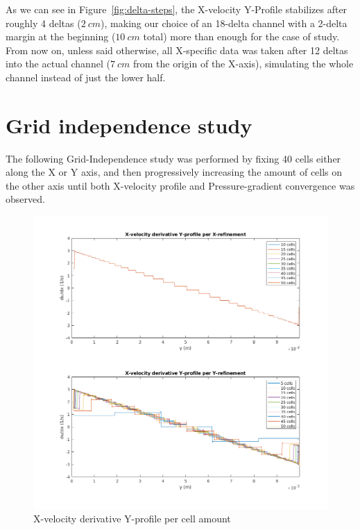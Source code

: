 \documentclass[12pt]{article}
\begin{document}
        As we can see in Figure~\ref{fig:delta-steps}, the X-velocity Y-Profile stabilizes after roughly 4 deltas ($ 2 \: cm $), making our choice of an 18-delta channel with a 2-delta margin at the beginning ($ 10 \: cm $ total) more than enough for the case of study. From now on, unless said otherwise, all X-specific data was taken after 12 deltas into the actual channel ($ 7 \: cm $ from the origin of the X-axis), simulating the whole channel instead of just the lower half.

\section{Grid independence study} \label{sec:independence}

        The following Grid-Independence study was performed by fixing 40 cells either along the X or Y axis, and then progressively increasing the amount of cells on the other axis until both X-velocity profile and Pressure-gradient convergence was observed.

        \begin{figure}[!ht]
                \includegraphics[width=\textwidth]{Grid_Ind_U_Profiles.png}
                \centering
                \caption{X-velocity derivative Y-profile per cell amount}
                \label{fig:grid_ind_u}
        \end{figure}
\end{document}
